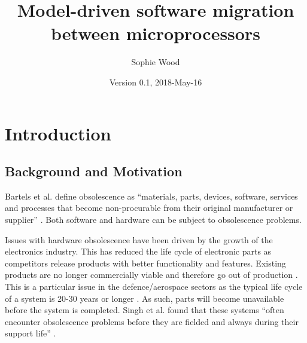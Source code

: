 \documentclass{UoYCSproject}
\author{Sophie Wood}
\title{Model-driven software migration between microprocessors}
\date{Version 0.1, 2018-May-16}
\begin{document}
\maketitle

\chapter{Introduction}
\section{Background and Motivation}

Bartels et al. define obsolescence as ``materials, parts, devices, software, services and processes that become non-procurable from their original manufacturer or supplier'' \parencite{bartels2012strategies}. Both software and hardware can be subject to obsolescence problems. 

Issues with hardware obsolescence have been driven by the growth of the electronics industry. This has reduced the life cycle of electronic parts as competitors release products with better functionality and features. Existing products are no longer commercially viable and therefore go out of production \parencite{bartels2012strategies}. This is a particular issue in the defence/aerospace sectors as the typical life cycle of a system is 20-30 years or longer \parencite{rojo2010obsolescence}. As such, parts will become unavailable before the system is completed. Singh et al. found that these systems ``often encounter obsolescence problems before they are fielded and always during their support life'' \parencite{singh2006obsolescence}.
\end{document}
